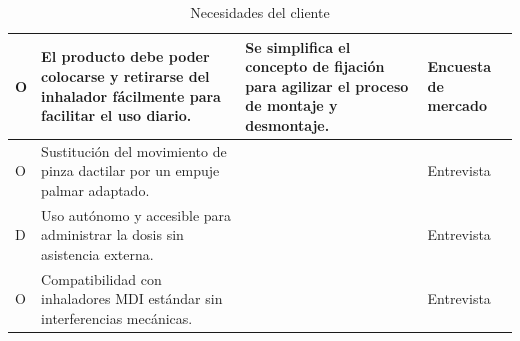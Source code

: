 \documentclass[11pt,a4paper]{article}
\begin{document}
\begin{table}[H]
\begin{tabular}{|p{2.8cm}|p{5.5cm}|p{2.5cm}|p{3.0cm}|}
\hline
O & El producto debe poder colocarse y retirarse del inhalador fácilmente para facilitar el uso diario. & Se simplifica el concepto de fijación para agilizar el proceso de montaje y desmontaje. & Encuesta de mercado \\
\hline
O & Sustitución del movimiento de pinza dactilar por un empuje palmar adaptado. &  & Entrevista \\
\hline
D & Uso autónomo y accesible para administrar la dosis sin asistencia externa. &  & Entrevista  \\
\hline
O & Compatibilidad con inhaladores MDI estándar sin interferencias mecánicas. &  & Entrevista  \\
\hline
\end{tabular}
\caption{Necesidades del cliente}
\end{table}

\newpage
\end{document}
